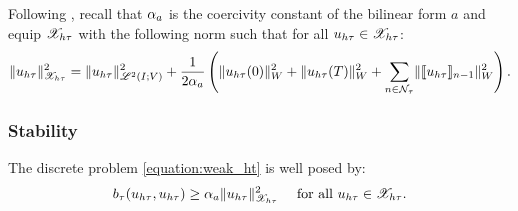Following \cite[p.~186]{Ern2021}, recall that $\alpha_{a}$ is the coercivity constant of the bilinear form $a$ and equip $\mathscr{X}_{h \tau}$ with the following norm such that for all $u_{h \tau} \in \mathscr{X}_{h \tau}$:
\begin{align}
    \lVert u_{h \tau} \rVert_{\mathscr{X}_{h \tau}}^2 = \lVert u_{h \tau} \rVert_{\mathscr{L}^{2}(I; V)}^2 + \frac{1}{2 \alpha_{a}} \left( \lVert u_{h \tau}(0) \rVert_W^2 + \lVert u_{h \tau}(T) \rVert_W^2 + \sum_{n \in \mathcal{N}_{\tau}} \lVert \llbracket u_{h \tau} \rrbracket_{n - 1} \rVert_W^2 \right). \label{eq:norm_ht}
\end{align}

\subsubsection{Stability}

\begin{lemma}[Coercivity]
    The discrete problem \cref{equation:weak_ht} is well posed by:
    \begin{align}
        b_{\tau}(u_{h \tau}, u_{h \tau}) &\geq \alpha_{a} \lVert u_{h \tau} \rVert_{\mathscr{X}_{h \tau}}^2 &\text{ for all } u_{h \tau} \in \mathscr{X}_{h \tau}. \label{eq:b_coercivity}
    \end{align}
\end{lemma}

